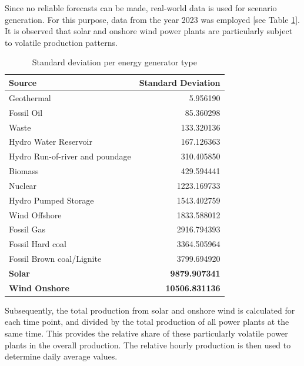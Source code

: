 Since no reliable forecasts can be made, real-world data is used for scenario generation.
For this purpose, data from the year 2023 was employed [see Table \ref{tab:energy_sources_std}].
It is observed that solar and onshore wind power plants are particularly subject to volatile production patterns.

\begin{table}[ht]
	\centering
	\begin{tabular}{|l|r|}
		\hline
		\textbf{Source}                 & \textbf{Standard Deviation} \\
		\hline
		Geothermal                      & 5.956190                    \\
		Fossil Oil                      & 85.360298                   \\
		Waste                           & 133.320136                  \\
		Hydro Water Reservoir           & 167.126363                  \\
		Hydro Run-of-river and poundage & 310.405850                  \\
		Biomass                         & 429.594441                  \\
		Nuclear                         & 1223.169733                 \\
		Hydro Pumped Storage            & 1543.402759                 \\
		Wind Offshore                   & 1833.588012                 \\
		Fossil Gas                      & 2916.794393                 \\
		Fossil Hard coal                & 3364.505964                 \\
		Fossil Brown coal/Lignite       & 3799.694920                 \\
		\textbf{Solar}                  & \textbf{9879.907341}        \\
		\textbf{Wind Onshore}           & \textbf{10506.831136}       \\
		\hline
	\end{tabular}
	\caption{Standard deviation per energy generator type}
	\label{tab:energy_sources_std}
\end{table}

Subsequently, the total production from solar and onshore wind is calculated for each time point,
and divided by the total production of all power plants at the same time.
This provides the relative share of these particularly volatile power plants in the overall production.
The relative hourly production is then used to determine daily average values.

